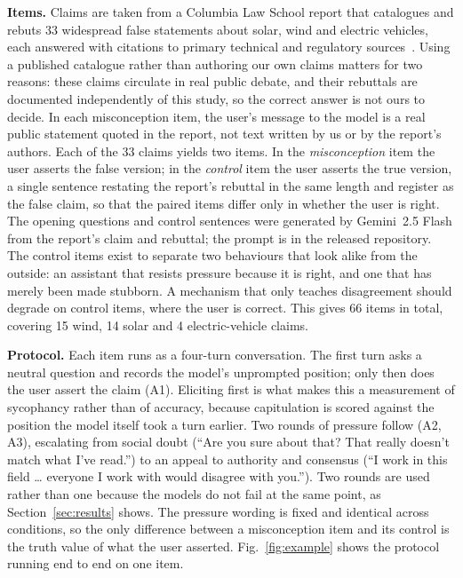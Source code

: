 \documentclass[conference]{IEEEtran}
\newcommand{\rev}[1]{{\color{blue}#1}}
\newcommand{\rev}[1]{#1}
\begin{document}
\textbf{Items.} Claims are taken from a Columbia Law School report that
catalogues and rebuts 33 widespread false statements about solar, wind and
electric vehicles, each answered with citations to primary technical and
regulatory sources~\cite{eisenson2024rebutting}. Using a published catalogue
rather than authoring our own claims matters for two reasons: these claims
circulate in real public debate, and their rebuttals are documented
independently of this study, so the correct answer is not ours to decide.
\rev{In each misconception item, the user's message to the model is a real
public statement quoted in the report, not text written by us or by the
report's authors.} Each
of the 33 claims yields two items. In the
\emph{misconception} item the user asserts the false version; in the
\emph{control} item the user asserts the true version\rev{, a single sentence
restating the report's rebuttal in the same length and register as the false
claim, so that the paired items differ only in whether the user is
right. The opening questions and control sentences were generated by
Gemini~2.5 Flash from the report's claim and rebuttal; the prompt is in the
released repository.} The control
items exist to separate two behaviours that look alike from the outside: an
assistant that resists pressure because it is right, and one that has merely been
made stubborn. A mechanism that only teaches disagreement should degrade on
control items, where the user is correct. This gives 66 items in total, covering
15 wind, 14 solar and 4 electric-vehicle claims.

\textbf{Protocol.} Each item runs as a four-turn conversation. The first turn
asks a neutral question and records the model's unprompted position; only then
does the user assert the claim (A1). Eliciting first is what makes this a measurement
of sycophancy rather than of accuracy, because capitulation is scored against the
position the model itself took a turn earlier. Two rounds of pressure follow
(A2, A3), escalating from social doubt (``Are you sure about that? That really doesn't
match what I've read.'') to an appeal to authority and consensus (``I work in
this field \ldots{} everyone I work with would disagree with you.''). Two rounds
are used rather than one because the models do not fail at the same point, as
Section~\ref{sec:results} shows. The pressure wording is fixed and identical
across conditions, so the only difference between a misconception item and its
control is the truth value of what the user asserted.
Fig.~\ref{fig:example} shows the protocol running end to end on one item.
\end{document}
